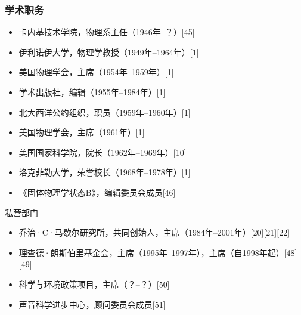 \subsubsection{学术职务}
\begin{itemize}
\item 卡内基技术学院，物理系主任（1946年–？）[45]  
\item 伊利诺伊大学，物理学教授（1949年–1964年）[1]  
\item 美国物理学会，主席（1954年–1959年）[1]  
\item 学术出版社，编辑（1955年–1984年）[1]  
\item 北大西洋公约组织，职员（1959年–1960年）[1]  
\item 美国物理学会，主席（1961年）[1]  
\item 美国国家科学院，院长（1962年–1969年）[10]  
\item 洛克菲勒大学，荣誉校长（1968年–1978年）[1]  
\item 《固体物理学状态B》，编辑委员会成员[46]
\end{itemize}
私营部门
\begin{itemize}
\item 乔治·C·马歇尔研究所，共同创始人，主席（1984年–2001年）[20][21][22]  
\item 理查德·朗斯伯里基金会，主席（1995年–1997年），主席（自1998年起）[48][49]  
\item 科学与环境政策项目，主席（？–？）[50]  
\item 声音科学进步中心，顾问委员会成员[51]
\end{itemize}
